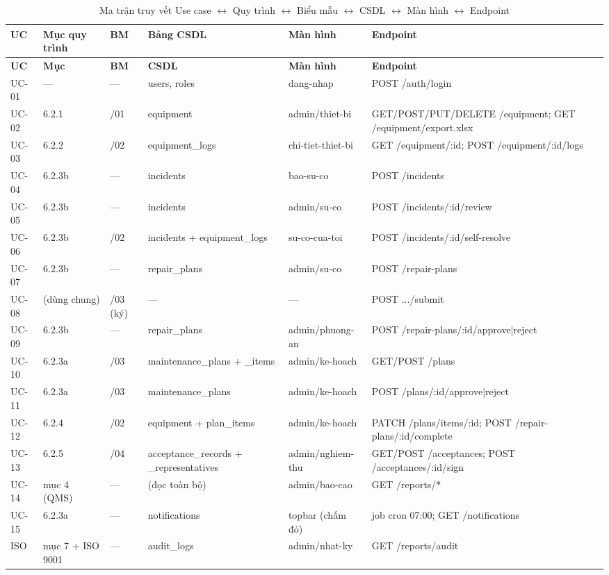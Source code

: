 \begin{longtable}{P{1.7cm}P{2.6cm}P{1.9cm}P{2.9cm}P{2.6cm}P{2.6cm}}
\caption{Ma trận truy vết Use case $\leftrightarrow$ Quy trình $\leftrightarrow$ Biểu mẫu $\leftrightarrow$ CSDL $\leftrightarrow$ Màn hình $\leftrightarrow$ Endpoint}\label{tab:trace}\\
\toprule
\textbf{UC} & \textbf{Mục quy trình} & \textbf{BM} & \textbf{Bảng CSDL} & \textbf{Màn hình} & \textbf{Endpoint} \\
\midrule
\endfirsthead
\toprule
\textbf{UC} & \textbf{Mục} & \textbf{BM} & \textbf{CSDL} & \textbf{Màn hình} & \textbf{Endpoint} \\
\midrule
\endhead
UC-01 & --- & --- & users, roles & dang-nhap & POST /auth/login \\
UC-02 & 6.2.1 & /01 & equipment & admin/thiet-bi & GET/POST/PUT/DELETE /equipment; GET /equipment/export.xlsx \\
UC-03 & 6.2.2 & /02 & equipment\_logs & chi-tiet-thiet-bi & GET /equipment/:id; POST /equipment/:id/logs \\
UC-04 & 6.2.3b & --- & incidents & bao-su-co & POST /incidents \\
UC-05 & 6.2.3b & --- & incidents & admin/su-co & POST /incidents/:id/review \\
UC-06 & 6.2.3b & /02 & incidents + equipment\_logs & su-co-cua-toi & POST /incidents/:id/self-resolve \\
UC-07 & 6.2.3b & --- & repair\_plans & admin/su-co & POST /repair-plans \\
UC-08 & (dùng chung) & /03 (ký) & --- & --- & POST .../submit \\
UC-09 & 6.2.3b & --- & repair\_plans & admin/phuong-an & POST /repair-plans/:id/approve|reject \\
UC-10 & 6.2.3a & /03 & maintenance\_plans + \_items & admin/ke-hoach & GET/POST /plans \\
UC-11 & 6.2.3a & /03 & maintenance\_plans & admin/ke-hoach & POST /plans/:id/approve|reject \\
UC-12 & 6.2.4 & /02 & equipment + plan\_items & admin/ke-hoach & PATCH /plans/items/:id; POST /repair-plans/:id/complete \\
UC-13 & 6.2.5 & /04 & acceptance\_records + \_representatives & admin/nghiem-thu & GET/POST /acceptances; POST /acceptances/:id/sign \\
UC-14 & mục 4 (QMS) & --- & (đọc toàn bộ) & admin/bao-cao & GET /reports/* \\
UC-15 & 6.2.3a & --- & notifications & topbar (chấm đỏ) & job cron 07:00; GET /notifications \\
ISO & mục 7 + ISO 9001 & --- & audit\_logs & admin/nhat-ky & GET /reports/audit \\
\bottomrule
\end{longtable}

